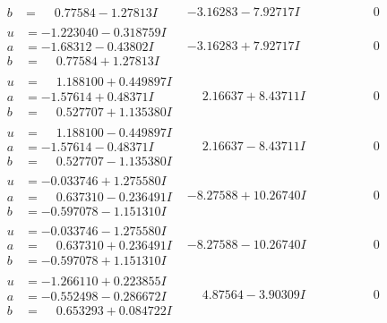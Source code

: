 \documentclass[1p]{elsarticle_modified}
\theoremstyle{definition}
\begin{document}
$$\begin{array}{c|c|c}
\begin{aligned}
b &= \phantom{-}0.77584 - 1.27813 I\end{aligned}
 & -3.16283 - 7.92717 I & \phantom{-0.000000 } 0 \\ \hline\begin{aligned}
u &= -1.223040 - 0.318759 I \\
a &= -1.68312 - 0.43802 I \\
b &= \phantom{-}0.77584 + 1.27813 I\end{aligned}
 & -3.16283 + 7.92717 I & \phantom{-0.000000 } 0 \\ \hline\begin{aligned}
u &= \phantom{-}1.188100 + 0.449897 I \\
a &= -1.57614 + 0.48371 I \\
b &= \phantom{-}0.527707 + 1.135380 I\end{aligned}
 & \phantom{-}2.16637 + 8.43711 I & \phantom{-0.000000 } 0 \\ \hline\begin{aligned}
u &= \phantom{-}1.188100 - 0.449897 I \\
a &= -1.57614 - 0.48371 I \\
b &= \phantom{-}0.527707 - 1.135380 I\end{aligned}
 & \phantom{-}2.16637 - 8.43711 I & \phantom{-0.000000 } 0 \\ \hline\begin{aligned}
u &= -0.033746 + 1.275580 I \\
a &= \phantom{-}0.637310 - 0.236491 I \\
b &= -0.597078 - 1.151310 I\end{aligned}
 & -8.27588 + 10.26740 I & \phantom{-0.000000 } 0 \\ \hline\begin{aligned}
u &= -0.033746 - 1.275580 I \\
a &= \phantom{-}0.637310 + 0.236491 I \\
b &= -0.597078 + 1.151310 I\end{aligned}
 & -8.27588 - 10.26740 I & \phantom{-0.000000 } 0 \\ \hline\begin{aligned}
u &= -1.266110 + 0.223855 I \\
a &= -0.552498 - 0.286672 I \\
b &= \phantom{-}0.653293 + 0.084722 I\end{aligned}
 & \phantom{-}4.87564 - 3.90309 I & \phantom{-0.000000 } 0 \\ \hline\begin{aligned}

\end{aligned}
\end{array}$$
\end{document}
